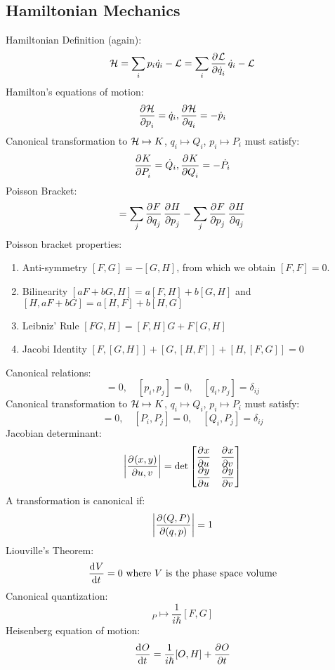 \subsection{Hamiltonian Mechanics}
Hamiltonian Definition (again):
\begin{equation}
    \HH = \sum_i p_i\dot{q}_i - \LL = \sum_i \dpd{\LL}{\dot{q}_i}\dot{q}_i - \LL
\end{equation}
Hamilton's equations of motion:
\begin{equation}
    \dpd{\HH}{p_i} = \dot{q}_i, \dpd{\HH}{q_i} = -\dot{p}_i
\end{equation}
Canonical transformation to $\mathcal{H} \mapsto K$, $q_i \mapsto Q_i$, $p_i \mapsto P_i$ must satisfy:
\begin{equation}
    \dpd{K}{P_i} = \dot{Q}_i, \dpd{K}{Q_i} = -\dot{P}_i
\end{equation}
Poisson Bracket:
\begin{equation}
    [F, H] = \sum_j \dpd{F}{q_j}\dpd{H}{p_j} - \sum_j \dpd{F}{p_j}\dpd{H}{q_j}
\end{equation}
Poisson bracket properties:
\begin{enumerate}
    \item Anti-symmetry $[F, G] = -[G, H]$, from which we obtain $[F, F] = 0$.
    \item Bilinearity $[aF + bG, H] = a[F, H] + b[G, H]$ and $[H, aF + bG] = a[H, F] + b[H, G]$
    \item Leibniz' Rule $[FG, H] = [F, H]G + F[G, H]$
    \item Jacobi Identity $[F, [G, H]] + [G, [H, F]] + [H, [F, G]] = 0$
\end{enumerate}
Canonical relations:
\begin{equation}
    [q_i, q_j] = 0,\quad [p_i, p_j] = 0, \quad [q_i, p_j] = \delta_{ij}
\end{equation}
Canonical transformation to $\mathcal{H} \mapsto K$, $q_i \mapsto Q_i$, $p_i \mapsto P_i$ must satisfy:
\begin{equation}
    [Q_i, Q_j] = 0,\quad [P_i, P_j] = 0, \quad [Q_i, P_j] = \delta_{ij}
\end{equation}
Jacobian determinant:
\begin{equation}
    \abs{\dpd{(x, y)}{u, v}} = \det \m{\dpd{x}{u} & \dpd{x}{v} \\ \dpd{y}{u} & \dpd{y}{v}}
\end{equation}
A transformation is canonical if:
\begin{equation}
    \abs{\dpd{(Q, P)}{(q, p)}} = 1
\end{equation}
Liouville's Theorem:
\begin{equation}
    \dod{V}{t} = 0 \text{ where $V$ is the phase space volume}
\end{equation}
Canonical quantization:
\begin{equation}
    [F, G]_P \mapsto \frac{1}{i\hbar}[F, G]
\end{equation}
Heisenberg equation of motion:
\begin{equation}
    \dod{O}{t} = \frac{1}{i\hbar}[O, H] + \dpd{O}{t}
\end{equation}
